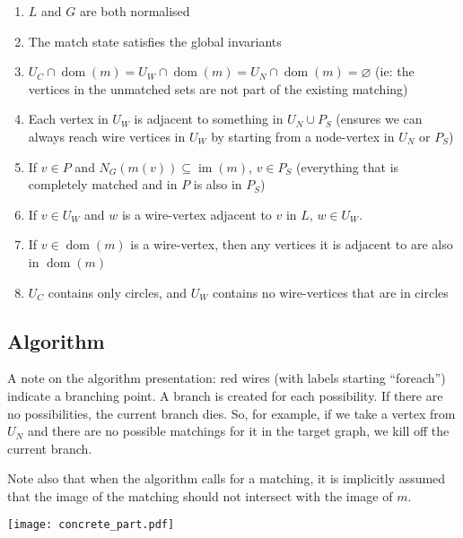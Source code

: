 \documentclass{article}
\DeclareMathOperator{\dom}{dom}
\DeclareMathOperator{\im}{im}
\begin{document}
\begin{enumerate}
  \renewcommand{\theenumi}{(\roman{enumi})}
  \renewcommand{\labelenumi}{\theenumi}
  \item \label{enum:il-inv-norm} $L$ and $G$ are both normalised
  \item \label{enum:il-inv-inv} The match state satisfies the global invariants
  \item \label{enum:il-inv-unmatched} $U_C\cap\dom(m) = U_W\cap\dom(m) = U_N\cap\dom(m) = \varnothing$ (ie: the vertices in the unmatched sets are not part of the existing matching)
  \item \label{enum:il-inv-reachable} Each vertex in $U_W$ is adjacent to something in $U_N\cup P_S$ (ensures we can always reach wire vertices in $U_W$ by starting from a node-vertex in $U_N$ or $P_S$)
  \item \label{enum:il-inv-Ps} If $v \in P$ and $N_G(m(v)) \subseteq \im(m)$, $v \in P_S$ (everything that is completely matched and in $P$ is also in $P_S$)
  \item \label{enum:il-inv-wire-uw} If $v \in U_W$ and $w$ is a wire-vertex adjacent to $v$ in $L$, $w \in U_W$.
  \item \label{enum:il-inv-wire-connected} If $v \in \dom(m)$ is a wire-vertex, then any vertices it is adjacent to are also in $\dom(m)$
  \item \label{enum:il-inv-circles} $U_C$ contains only circles, and $U_W$ contains no wire-vertices that are in circles
\end{enumerate}

\subsection{Algorithm}

A note on the algorithm presentation: red wires (with labels starting ``foreach'') indicate a branching point.  A branch is created for each possibility.  If there are no possibilities, the current branch dies.  So, for example, if we take a vertex from $U_N$ and there are no possible matchings for it in the target graph, we kill off the current branch.

Note also that when the algorithm calls for a matching, it is implicitly assumed that the image of the matching should not intersect with the image of $m$.

\begin{center}
  \texttt{[image: concrete\_part.pdf]}
\end{center}
\end{document}
